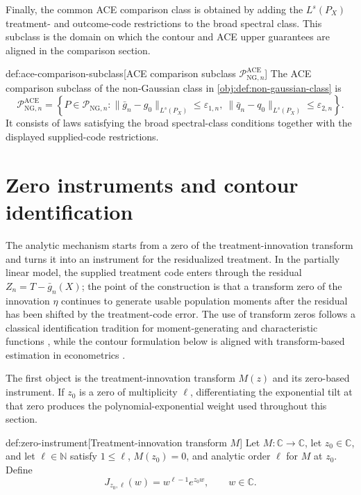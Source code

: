 \documentclass[11pt]{article}
\begin{document}
Finally, the common ACE comparison class is obtained by adding the \(L^s(P_X)\) treatment- and outcome-code restrictions to the broad spectral class. This subclass is the domain on which the contour and ACE upper guarantees are aligned in the comparison section.

\begin{definitionv}{def:ace-comparison-subclass}[ACE comparison subclass \(\mathcal P_{\mathrm{NG},n}^{\mathrm{ACE}}\)]
The ACE comparison subclass of the non-Gaussian class in \cref{obj:def:non-gaussian-class} is
\[
\mathcal P_{\mathrm{NG},n}^{\mathrm{ACE}}
=
\left\{
P\in\mathcal P_{\mathrm{NG},n}:
\|\bar g_n-g_0\|_{L^s(P_X)}\le\varepsilon_{1,n},
\ 
\|\bar q_n-q_0\|_{L^s(P_X)}\le\varepsilon_{2,n}
\right\}.
\]
It consists of laws satisfying the broad spectral-class conditions together with the displayed supplied-code restrictions.
\end{definitionv}


\section{Zero instruments and contour identification}

The analytic mechanism starts from a zero of the treatment-innovation transform and turns it into an instrument for the residualized treatment. In the partially linear model, the supplied treatment code enters through the residual \(Z_n=T-\bar g_n(X)\); the point of the construction is that a transform zero of the innovation \(\eta\) continues to generate usable population moments after the residual has been shifted by the treatment-code error. The use of transform zeros follows a classical identification tradition for moment-generating and characteristic functions \citep{KaganLinnikRao1973,Mattner1992,DHaultfoeuille2011,DarollesFanFlorensRenault2011,HuShiu2022}, while the contour formulation below is aligned with transform-based estimation in econometrics \citep{FeuervergerMcDunnough1981,Singleton2001,CarrascoFlorensRenault2007,Carrasco2017}.

The first object is the treatment-innovation transform \(M(z)\) and its zero-based instrument. If \(z_0\) is a zero of multiplicity \(\ell\), differentiating the exponential tilt at that zero produces the polynomial-exponential weight used throughout this section.

\begin{definitionv}{def:zero-instrument}[Treatment-innovation transform \(M\)]
Let \(M:\mathbb C\to\mathbb C\), let \(z_0\in\mathbb C\), and let \(\ell\in\mathbb N\) satisfy \(1\le \ell\), \(M(z_0)=0\), and analytic order \(\ell\) for \(M\) at \(z_0\). Define
\[
J_{z_0,\ell}(w)=w^{\ell-1}e^{z_0w},\qquad w\in\mathbb C.
\]
\end{definitionv}
\end{document}
